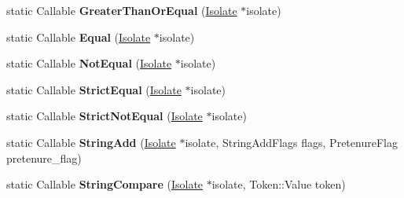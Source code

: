 \begin{DoxyCompactItemize}
\item 
static Callable {\bfseries Greater\+Than\+Or\+Equal} (\hyperlink{classv8_1_1internal_1_1_isolate}{Isolate} $\ast$isolate)\hypertarget{classv8_1_1internal_1_1_code_factory_ad615031d74b849047947dc715e845816}{}\label{classv8_1_1internal_1_1_code_factory_ad615031d74b849047947dc715e845816}

\item 
static Callable {\bfseries Equal} (\hyperlink{classv8_1_1internal_1_1_isolate}{Isolate} $\ast$isolate)\hypertarget{classv8_1_1internal_1_1_code_factory_a704af35977037326d0a45bfefa2c2820}{}\label{classv8_1_1internal_1_1_code_factory_a704af35977037326d0a45bfefa2c2820}

\item 
static Callable {\bfseries Not\+Equal} (\hyperlink{classv8_1_1internal_1_1_isolate}{Isolate} $\ast$isolate)\hypertarget{classv8_1_1internal_1_1_code_factory_a782c5b45894329f956696585134088c5}{}\label{classv8_1_1internal_1_1_code_factory_a782c5b45894329f956696585134088c5}

\item 
static Callable {\bfseries Strict\+Equal} (\hyperlink{classv8_1_1internal_1_1_isolate}{Isolate} $\ast$isolate)\hypertarget{classv8_1_1internal_1_1_code_factory_ad519865500836e5d3b9fa382c37ecdb2}{}\label{classv8_1_1internal_1_1_code_factory_ad519865500836e5d3b9fa382c37ecdb2}

\item 
static Callable {\bfseries Strict\+Not\+Equal} (\hyperlink{classv8_1_1internal_1_1_isolate}{Isolate} $\ast$isolate)\hypertarget{classv8_1_1internal_1_1_code_factory_a58e1788c8529485f9c0cee210d084ed0}{}\label{classv8_1_1internal_1_1_code_factory_a58e1788c8529485f9c0cee210d084ed0}

\item 
static Callable {\bfseries String\+Add} (\hyperlink{classv8_1_1internal_1_1_isolate}{Isolate} $\ast$isolate, String\+Add\+Flags flags, Pretenure\+Flag pretenure\+\_\+flag)\hypertarget{classv8_1_1internal_1_1_code_factory_af74a2b9d1cacdad8e46ec6ee95f94476}{}\label{classv8_1_1internal_1_1_code_factory_af74a2b9d1cacdad8e46ec6ee95f94476}

\item 
static Callable {\bfseries String\+Compare} (\hyperlink{classv8_1_1internal_1_1_isolate}{Isolate} $\ast$isolate, Token\+::\+Value token)\hypertarget{classv8_1_1internal_1_1_code_factory_a5d6d4605332c957483b1908e8d2f4089}{}\label{classv8_1_1internal_1_1_code_factory_a5d6d4605332c957483b1908e8d2f4089}


\end{DoxyCompactItemize}
